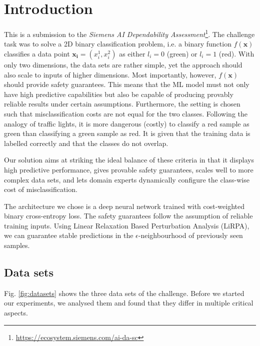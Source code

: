 \documentclass[acmsmall,nonacm]{acmart}
\begin{document}
\section{Introduction}

This is a submission to the \textit{Siemens AI Dependability Assessment}\footnote{\url{https://ecosystem.siemens.com/ai-da-sc}}. The challenge task was to solve a 2D binary classification problem, i.e. a binary function $f(\mathbf{x})$ classifies a data point $\mathbf{x_i} = (x_i^1, x_i^2)$ as either $l_i=0$ (green) or $l_i=1$ (red). With only two dimensions, the data sets are rather simple, yet the approach should also scale to inputs of higher dimensions. Most importantly, however, $f(\mathbf{x})$ should provide safety guarantees. This means that the ML model must not only have high predictive capabilities but also be capable of producing provably reliable results under certain assumptions. Furthermore, the setting is chosen such that misclassification costs are not equal for the two classes. Following the analogy of traffic lights, it is more dangerous (costly) to classify a red sample as green than classifying a green sample as red. It is given that the training data is labelled correctly and that the classes do not overlap.  

Our solution aims at striking the ideal balance of these criteria in that it displays high predictive performance, gives provable safety guarantees, scales well to more complex data sets, and lets domain experts dynamically configure the class-wise cost of misclassification.

The architecture we chose is a deep neural network trained with cost-weighted binary cross-entropy loss. The safety guarantees follow the assumption of reliable training inputs. Using Linear Relaxation Based Perturbation Analysis (LiRPA), we can guarantee stable predictions in the $\epsilon$-neighbourhood of previously seen samples.

\subsection{Data sets}

Fig. \ref{fig:datasets} shows the three data sets of the challenge. Before we started our experiments, we analysed them and found that they differ in multiple critical aspects. 
\end{document}
